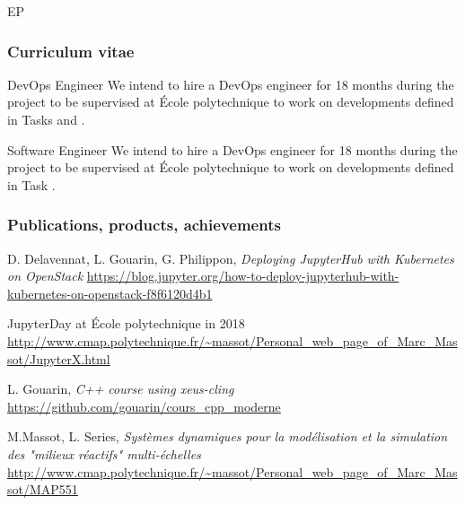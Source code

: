 \begin{sitedescription}{EP}
\subsubsection*{Curriculum vitae}






\begin{participant}[type=R,PM=18,salary=5500]{DevOps Engineer}
  We intend to hire a DevOps engineer for 18 months during the project to be supervised at \'Ecole polytechnique to work on developments defined in Tasks  and .
\end{participant}

\begin{participant}[type=R,PM=18,salary=5500]{Software Engineer}
  We intend to hire a DevOps engineer for 18 months during the project to be supervised at \'Ecole polytechnique to work on developments defined in Task .
\end{participant}

\subsubsection*{Publications, products, achievements}

\begin{compactenum}
\item D. Delavennat, L. Gouarin, G. Philippon, \emph{Deploying JupyterHub with Kubernetes on OpenStack} \newline
\url{https://blog.jupyter.org/how-to-deploy-jupyterhub-with-kubernetes-on-openstack-f8f6120d4b1}
\item JupyterDay at \'Ecole polytechnique in 2018 \newline
\url{http://www.cmap.polytechnique.fr/~massot/Personal_web_page_of_Marc_Massot/JupyterX.html}
\item L. Gouarin, \emph{C++ course using xeus-cling} \newline
\url{https://github.com/gouarin/cours_cpp_moderne}
\item M.Massot, L. Series, \emph{Systèmes dynamiques pour la modélisation et la simulation des "milieux réactifs" multi-échelles} \newline
\url{http://www.cmap.polytechnique.fr/~massot/Personal_web_page_of_Marc_Massot/MAP551}
\end{compactenum}


\end{sitedescription}
